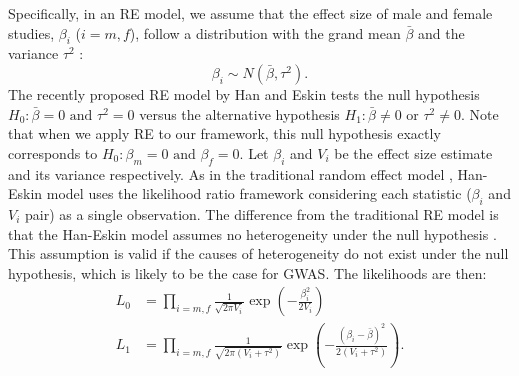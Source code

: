 \documentclass[11pt]{article}
\begin{document}
Specifically, in an RE model, we assume that the effect size of male and female studies, $\beta_i$ 
($i = m, f$),
follow a distribution with the grand mean $\bar{\beta}$ and the variance $\tau^2$ \citep{Han:AmJHumGenet:2011,DerSimonian:ControlClinTrials:1986}:
\[\beta_i \sim N(\bar{\beta}, \tau^2).\]
The recently proposed RE model by Han and Eskin \citep{Han:AmJHumGenet:2011} tests
the null hypothesis $H_0: \bar{\beta} = 0 \mbox{ and } \tau^2=0$ versus the 
alternative hypothesis $H_1: \bar{\beta} \ne 0 \mbox { or } \tau^2 \ne 0$.
Note that when we apply RE to our framework, this null hypothesis exactly corresponds to $H_0:\beta_m=0\mbox{ and }\beta_f=0$.
Let $\beta_i$ and $V_i$ be the effect size estimate and its variance respectively.
As in the traditional random effect model \citep{DerSimonian:ControlClinTrials:1986},
Han-Eskin model uses the likelihood ratio framework considering each statistic ($\beta_i$ and $V_i$ pair)
as a single observation. 
The difference from the traditional RE model is that
the Han-Eskin model assumes no heterogeneity under the null hypothesis \citep{Han:AmJHumGenet:2011}. 
This assumption is valid if the causes of heterogeneity do not exist under the null hypothesis,
which is likely to be the case for GWAS.
The likelihoods are then:
\begin{align*}
 L_0 &= \prod_{i = m, f} \frac{1}{\sqrt{2\pi V_i}} \exp \left(
-\frac{\beta_i^2}{2V_i}\right)\\
L_1 &= \prod_{i = m, f}  \frac{1}{\sqrt{2\pi (V_i+{\tau}^2)}} \exp \left(
-\frac{(\beta_i-\bar{\beta})^2}{2(V_i+{\tau}^2)}\right).
\end{align*} 
\end{document}
